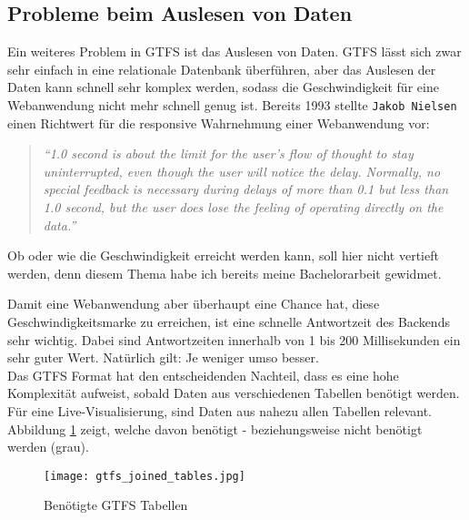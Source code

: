 
        \subsection*{Probleme beim Auslesen von Daten}
        \label{sub:subsection_name}
        Ein weiteres Problem in GTFS ist das Auslesen von Daten. GTFS lässt sich zwar sehr einfach in eine relationale Datenbank überführen, aber das Auslesen der Daten kann schnell sehr komplex werden, sodass die Geschwindigkeit für eine Webanwendung nicht mehr schnell genug ist. Bereits 1993 stellte \texttt{Jakob Nielsen} einen Richtwert für die responsive Wahrnehmung einer Webanwendung vor:

        \begin{quote}
          \textit{"`1.0 second is about the limit for the user's flow of thought to stay uninterrupted, even though the user will notice the delay. Normally, no special feedback is necessary during delays of more than 0.1 but less than 1.0 second, but the user does lose the feeling of operating directly on the data."'}\parencite{nielsen}
        \end{quote}

        Ob oder wie die Geschwindigkeit erreicht werden kann, soll hier nicht vertieft werden, denn diesem Thema habe ich bereits meine Bachelorarbeit gewidmet\parencite{lorer}.

        Damit eine Webanwendung aber überhaupt eine Chance hat, diese Geschwindigkeitsmarke zu erreichen, ist eine schnelle Antwortzeit des Backends sehr wichtig. Dabei sind Antwortzeiten innerhalb von 1 bis 200 Millisekunden ein sehr guter Wert. Natürlich gilt: Je weniger umso besser.\\

        Das GTFS Format hat den entscheidenden Nachteil, dass es eine hohe Komplexität aufweist, sobald Daten aus verschiedenen Tabellen benötigt werden. Für eine Live-Visualisierung, sind Daten aus nahezu allen Tabellen relevant. Abbildung \ref{fig:gtfs_joined_tables} zeigt, welche davon benötigt - beziehungsweise nicht benötigt werden (grau).

        \begin{figure}[htbp]
          \begin{center}
            \texttt{[image: gtfs\_joined\_tables.jpg]}
            \caption{Benötigte GTFS Tabellen\parencite{google_gtfs_reference}}
            \label{fig:gtfs_joined_tables}
          \end{center}
        \end{figure}

